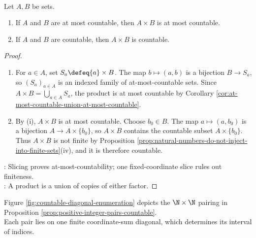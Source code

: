 \begin{corollary} \label{cor:countable-cartesian-products} \\
Let $A,B$ be sets.
\begin{enumerate}[label=(\roman*)]
\setlength{\itemsep}{0pt}
\item If $A$ and $B$ are at most countable, then $A\times B$ is at most countable.
\item If $A$ and $B$ are countable, then $A\times B$ is countable.
\end{enumerate}
\begin{proof}
\begin{enumerate}[label=(\roman*)]
\setlength{\itemsep}{0pt}
\item For $a\in A$, set $S_a\defeq\{a\}\times B$. The map $b\mapsto(a,b)$ is a bijection $B\to S_a$, so $(S_a)_{a\in A}$ is an indexed family of at-most-countable sets. Since $A\times B=\bigcup\limits_{a\in A}S_a$, the product is at most countable by Corollary \ref{cor:at-most-countable-union-at-most-countable}.
\item By (i), $A\times B$ is at most countable. Choose $b_0\in B$. The map $a\mapsto(a,b_0)$ is a bijection $A\to A\times\{b_0\}$, so $A\times B$ contains the countable subset $A\times\{b_0\}$. Thus $A\times B$ is not finite by Proposition \ref{prop:natural-numbers-do-not-inject-into-finite-sets}(iv), and it is therefore countable.
\end{enumerate}
: Slicing proves at-most-countability; one fixed-coordinate slice rules out finiteness.\\
: A product is a union of copies of either factor.
\end{proof}
\end{corollary}

\begin{illustrationfigure}[H]
  
  \caption{Diagonal enumeration of $\N\times\N$ by finite $i+j$ diagonals.}
  \label{fig:countable-diagonal-enumeration}
\end{illustrationfigure}

Figure \ref{fig:countable-diagonal-enumeration} depicts the $\N\times\N$ pairing in Proposition \ref{prop:positive-integer-pairs-countable}.\\
Each pair lies on one finite coordinate-sum diagonal, which determines its interval of indices.

